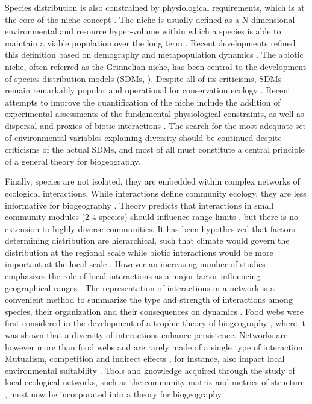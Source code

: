 Species distribution is also constrained by physiological requirements, which is at the core of the niche concept \citep{Peterson2011Ecologicala}. The niche is usually defined as a N-dimensional environmental and resource hyper-volume within which a species is able to maintain a viable population over the long term \citep{Chase2003Ecological}. Recent developments refined this definition based on demography and metapopulation dynamics \citep{Holt2009Trophic}. The abiotic niche, often referred as the Grinnelian niche, has been central to the development of species distribution models (SDMs, \cite{Jeschke2008Usefulness}). Despite all of its criticisms, SDMs remain remarkably popular and operational for conservation ecology \citep{Guisan2013Predicting}. Recent attempts to improve the quantification of the niche include the addition of experimental assessments of the fundamental physiological constraints, as well as dispersal and proxies of biotic interactions \citep{Boulangeat2012Accounting}. The search for the most adequate set of environmental variables explaining diversity should be continued despite criticisms of the actual SDMs, and most of all must constitute a central principle of a general theory for biogeography.

Finally, species are not isolated, they are embedded within complex networks of ecological interactions. While interactions define community ecology, they are less informative for biogeography \citep{Peterson2003Predicting}. Theory predicts that interactions in small community modules (2-4 species) should influence range limits \citep{Gilman2010Framework}, but there is no extension to highly diverse communities. It has been hypothesized that factors determining distribution are hierarchical, such that climate would govern the distribution at the regional scale while biotic interactions would be more important at the local scale \citep{Araujo2014Geographic}. However an increasing number of studies emphasizes the role of local interactions as a major factor influencing geographical ranges \citep{Jabot2012Bitrophic,Gotelli2010Macroecological}. The representation of interactions in a network is a convenient method to summarize the type and strength of interactions among species, their organization \citep{Proulx2005Network} and their consequences on dynamics \citep{Allesina2012Stability}. Food webs were first considered in the development of a trophic theory of biogeography \citep{Gravel2011Trophic}, where it was shown that a diversity of interactions enhance persistence. Networks are however more than food webs and are rarely made of a single type of interaction \citep{Kefi2012More}. Mutualism, competition and indirect effects \citep{Wootton1994Nature}, for instance, also impact local environmental suitability \citep{Godsoe2012How}. Tools and knowledge acquired through the study of local ecological networks, such as the community matrix and metrics of structure \citep{Allesina2012Stability}, must now be incorporated into a theory for biogeography.

